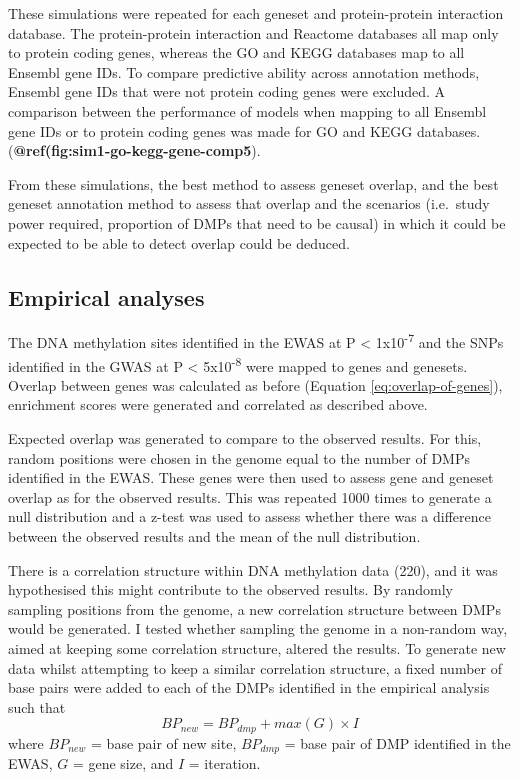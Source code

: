 \documentclass[11pt,oneside]{bristolthesis}
\begin{document}
These simulations were repeated for each geneset and protein-protein interaction database. The protein-protein interaction and Reactome databases all map only to protein coding genes, whereas the GO and KEGG databases map to all Ensembl gene IDs. To compare predictive ability across annotation methods, Ensembl gene IDs that were not protein coding genes were excluded. A comparison between the performance of models when mapping to all Ensembl gene IDs or to protein coding genes was made for GO and KEGG databases. (\textbf{@ref(fig:sim1-go-kegg-gene-comp5}).

From these simulations, the best method to assess geneset overlap, and the best geneset annotation method to assess that overlap and the scenarios (i.e.~study power required, proportion of DMPs that need to be causal) in which it could be expected to be able to detect overlap could be deduced.

\hypertarget{empirical-analyses}{%
\subsection{Empirical analyses}\label{empirical-analyses}}

The DNA methylation sites identified in the EWAS at P \textless{} 1x10\textsuperscript{-7} and the SNPs identified in the GWAS at P \textless{} 5x10\textsuperscript{-8} were mapped to genes and genesets. Overlap between genes was calculated as before (Equation \eqref{eq:overlap-of-genes}), enrichment scores were generated and correlated as described above.

Expected overlap was generated to compare to the observed results. For this, random positions were chosen in the genome equal to the number of DMPs identified in the EWAS. These genes were then used to assess gene and geneset overlap as for the observed results. This was repeated 1000 times to generate a null distribution and a z-test was used to assess whether there was a difference between the observed results and the mean of the null distribution.

There is a correlation structure within DNA methylation data (220), and it was hypothesised this might contribute to the observed results. By randomly sampling positions from the genome, a new correlation structure between DMPs would be generated. I tested whether sampling the genome in a non-random way, aimed at keeping some correlation structure, altered the results. To generate new data whilst attempting to keep a similar correlation structure, a fixed number of base pairs were added to each of the DMPs identified in the empirical analysis such that
\begin{equation}
    BP_{new} = BP_{dmp} + max(G) \times I
    \label{eq:generating-new-positions}
\end{equation}
where \(BP_{new}\) = base pair of new site, \(BP_{dmp}\) = base pair of DMP identified in the EWAS, \(G\) = gene size, and \(I\) = iteration.
\end{document}
